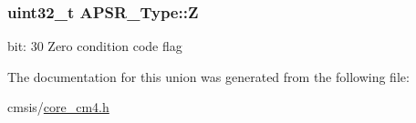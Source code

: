 \subsubsection[{\texorpdfstring{Z}{Z}}]{\setlength{\rightskip}{0pt plus 5cm}uint32\+\_\+t A\+P\+S\+R\+\_\+\+Type\+::Z}\hypertarget{union_a_p_s_r___type_a3b04d58738b66a28ff13f23d8b0ba7e5}{}\label{union_a_p_s_r___type_a3b04d58738b66a28ff13f23d8b0ba7e5}
bit\+: 30 Zero condition code flag 

The documentation for this union was generated from the following file\+:\begin{DoxyCompactItemize}
\item 
cmsis/\hyperlink{core__cm4_8h}{core\+\_\+cm4.\+h}\end{DoxyCompactItemize}
